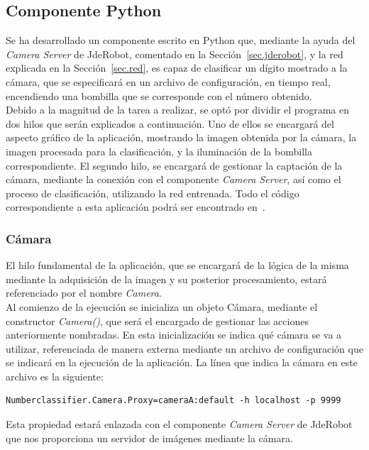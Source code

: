 \subsection{Componente Python} \label{sec.componente}
Se ha desarrollado un componente escrito en Python que, mediante la ayuda del \textit{Camera Server} de JdeRobot, comentado en la Sección~\ref{sec.jderobot},  y la red explicada en la Sección~\ref{sec.red}, es capaz de clasificar un dígito mostrado a la cámara, que se especificará en un archivo de configuración, en tiempo real, encendiendo una bombilla que se corresponde con el número obtenido.\\

Debido a la magnitud de la tarea a realizar, se optó por dividir el programa en dos hilos que serán explicados a continuación. Uno de ellos se encargará del aspecto gráfico de la aplicación, mostrando la imagen obtenida por la cámara, la imagen procesada para la clasificación, y la iluminación de la bombilla correspondiente. El segundo hilo, se encargará de gestionar la captación de la cámara, mediante la conexión con el componente \textit{Camera Server}, así como el proceso de clasificación, utilizando la red entrenada. Todo el código correspondiente a esta aplicación podrá ser encontrado en~\cite{codigo}.

\subsubsection{Cámara} \label{sec.camara}
El hilo fundamental de la aplicación, que se encargará de la lógica de la misma mediante la adquisición de la imagen y su posterior procesamiento, estará referenciado por el nombre \textit{Camera}.\\

Al comienzo de la ejecución se inicializa un objeto Cámara, mediante el constructor \textit{Camera()}, que será el encargado de gestionar las acciones anteriormente nombradas. En esta inicialización se indica qué cámara se va a utilizar, referenciada de manera externa mediante un archivo de configuración que se indicará en la ejecución de la aplicación. La línea que indica la cámara en este archivo es la siguiente:
\vspace{10pt}
\begin{lstlisting}[frame=single]
	Numberclassifier.Camera.Proxy=cameraA:default -h localhost -p 9999
\end{lstlisting}

Esta propiedad estará enlazada con el componente \textit{Camera Server} de JdeRobot que nos proporciona un servidor de imágenes mediante la cámara.\\


